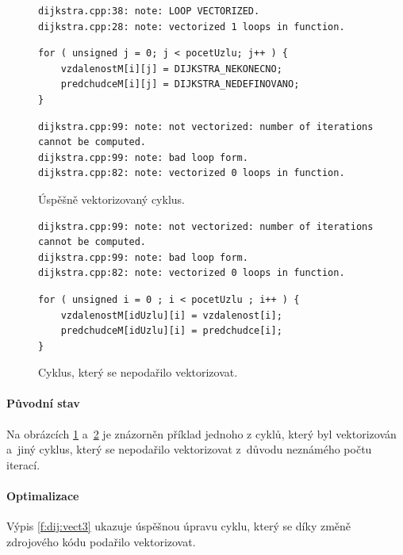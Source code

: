 \begin{figure}
    \centering
	\caption{Úspěšně vektorizovaný cyklus.}
	\label{f:dij:vect1}
    \begin{lstlisting}
dijkstra.cpp:38: note: LOOP VECTORIZED.
dijkstra.cpp:28: note: vectorized 1 loops in function.
    \end{lstlisting}
	\begin{lstlisting}
for ( unsigned j = 0; j < pocetUzlu; j++ ) {
	vzdalenostM[i][j] = DIJKSTRA_NEKONECNO;
	predchudceM[i][j] = DIJKSTRA_NEDEFINOVANO;
}
    \end{lstlisting}
    
    \begin{lstlisting}
dijkstra.cpp:99: note: not vectorized: number of iterations cannot be computed.
dijkstra.cpp:99: note: bad loop form.
dijkstra.cpp:82: note: vectorized 0 loops in function.
    \end{lstlisting}
\end{figure}
\begin{figure}
    \centering
    \caption{Cyklus, který se nepodařilo vektorizovat.}
	\label{f:dij:vect2}
    \begin{lstlisting}
dijkstra.cpp:99: note: not vectorized: number of iterations cannot be computed.
dijkstra.cpp:99: note: bad loop form.
dijkstra.cpp:82: note: vectorized 0 loops in function.
    \end{lstlisting}
    
	\begin{lstlisting}
for ( unsigned i = 0 ; i < pocetUzlu ; i++ ) {
	vzdalenostM[idUzlu][i] = vzdalenost[i];
	predchudceM[idUzlu][i] = predchudce[i];
}
	\end{lstlisting}
\end{figure}

\paragraph{Původní stav}
Na obrázcích \ref{f:dij:vect1} a~\ref{f:dij:vect2} je znázorněn příklad jednoho z cyklů, který byl vektorizován a~jiný cyklus, který se nepodařilo vektorizovat z~důvodu neznámého počtu iterací.

\paragraph{Optimalizace}
Výpis \ref{f:dij:vect3} ukazuje úspěšnou úpravu cyklu, který se díky změně zdrojového kódu podařilo vektorizovat.

